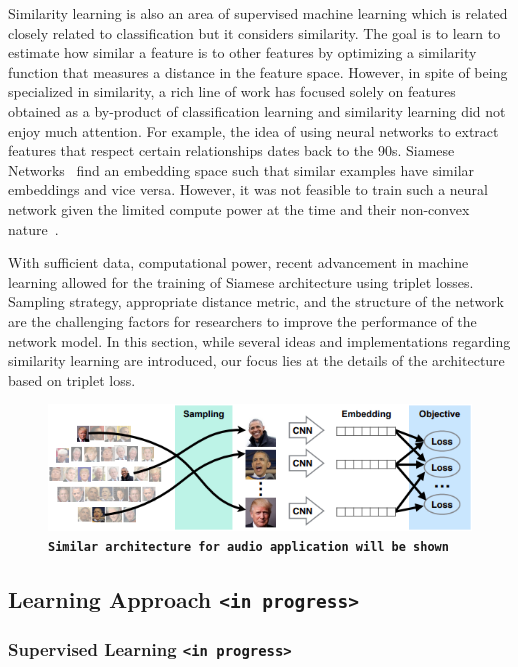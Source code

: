 Similarity learning is also an area of supervised machine learning which is related closely related to classification but it considers similarity. The goal is to learn to estimate how similar a feature is to other features by optimizing a similarity function that measures a distance in the feature space. However, in spite of being specialized in similarity, a rich line of work has focused solely on features obtained as a by-product of classification learning and similarity learning did not enjoy much attention. For example, the idea of using neural networks to extract features that respect certain relationships dates back to the 90s. Siamese Networks~\cite{bromley1993} find an embedding space such that similar examples have similar embeddings and vice versa. However, it was not feasible to train such a neural network given the limited compute power at the time and their non-convex nature~\cite{chao2017}.

 With sufficient data, computational power, recent advancement in machine learning allowed for the training of Siamese architecture using triplet losses. Sampling strategy, appropriate distance metric, and the structure of the network are the challenging factors for researchers to improve the performance of the network model.  In this section, while several ideas and implementations regarding similarity learning are introduced, our focus lies at the details of the architecture based on triplet loss.

\begin{figure}[htb]
	\centering
	\includegraphics[width=13cm]{Figures/overview_deep_embedding.png}
	\caption{\texttt{\textbf{Similar architecture for audio application will be shown}}}
	\label{deep-model}
\end{figure}

\subsection{Learning Approach \texttt{<in progress>}}
\subsubsection*{Supervised Learning \texttt{<in progress>}}
